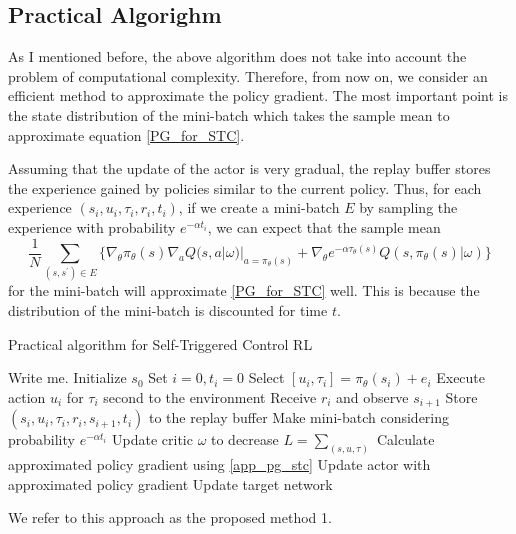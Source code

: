 \documentclass[english, dvipdfmx]{ampmt}             %
\begin{document}
\subsection{Practical Algorighm}
As I mentioned before, the above algorithm does not take into account the problem of computational complexity. Therefore, from now on, we consider an efficient method to approximate the policy gradient. The most important point is the state distribution of the mini-batch which takes the sample mean to approximate equation \eqref{PG_for_STC}. \par
Assuming that the update of the actor is very gradual, the replay buffer stores the experience gained by policies similar to the current policy. Thus, for each experience $(s_i, u_i, \tau_i, r_i, t_i)$, if we create a mini-batch $E$ by sampling the experience with probability $e^{-\alpha t_i}$, we can expect that the sample mean
\begin{equation}
	\frac{1}{N}\sum_{(s, s^{\prime})\in E}\{\nabla_{\theta}\pi_{\theta}(s)\nabla_{a}Q(s,a|\omega)|_{a=\pi_{\theta}(s)}+\nabla_{\theta}e^{-\alpha\tau_{\theta}(s)}Q(s, \pi_{\theta}(s)|\omega)\} \label{app_pg_stc}
\end{equation}
for the mini-batch will approximate \eqref{PG_for_STC} well. This is because the distribution of the mini-batch is discounted for time $t$.

\begin{algorithm}                      
\caption{Practical algorithm for Self-Triggered Control RL}         
\label{alg3}                          
\begin{algorithmic}                  
    \STATE Write me.
    	\STATE Initialize $s_0$
    	\STATE Set $i = 0, t_i = 0$
    		\STATE Select $[u_i, \tau_i] = \pi_{\theta}(s_i) + e_i$
		\STATE Execute action $u_i$ for $\tau_i$ second to the environment
		\STATE Receive $r_i$ and observe $s_{i+1}$
		\STATE Store $(s_i, u_i, \tau_i, r_i, s_{i+1}, t_i)$ to the replay buffer
		\STATE Make mini-batch considering probability $e^{-\alpha t_i}$
		\STATE Update critic $\omega$ to decrease $L = \sum_{(s,u,\tau)}$
		\STATE Calculate approximated policy gradient using \eqref{app_pg_stc}
		\STATE Update actor with approximated policy gradient
		\STATE Update target network
    	\ENDWHILE
    \ENDFOR
\end{algorithmic}
\end{algorithm}
We refer to this approach as the proposed method 1.
\end{document}
